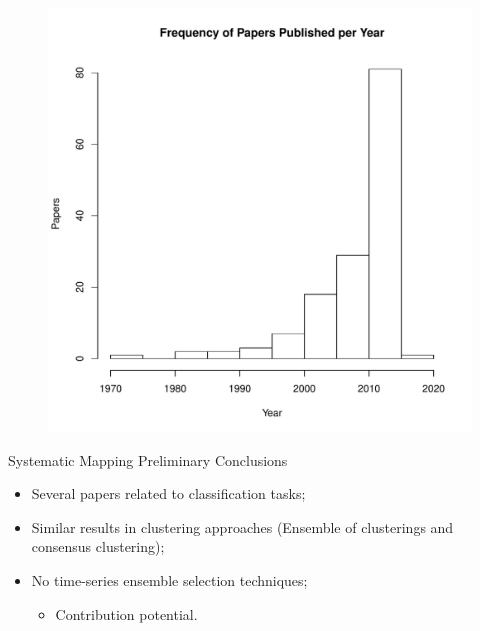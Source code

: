 \documentclass{beamer}
\begin{document}
\begin{frame}
  \begin{figure}
    \centering
    \includegraphics[width=0.7\columnwidth]{hist-paper-year.pdf}
    \label{fig:hist-paper-year}
  \end{figure}
\end{frame}

\begin{frame}{Systematic Mapping Preliminary Conclusions}
  \begin{itemize}
  \item Several papers related to classification tasks;
  \item Similar results in clustering approaches (Ensemble of clusterings and consensus clustering);
  \item No time-series ensemble selection techniques;
    \begin{itemize}
    \item Contribution potential.
    \end{itemize}
  \end{itemize}
\end{frame}
\end{document}
